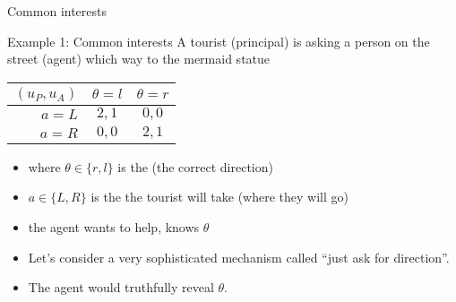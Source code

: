 \documentclass[english,10pt
,aspectratio=169
]{beamer}
\begin{document}
\begin{frame}{Common interests}
	\begin{exampleblock}{Example 1: Common interests}
		A tourist (principal) is asking a person on the street (agent) which way to the mermaid statue
		\begin{center}
			\begin{tabular}{r | c | c |}
				$(u_P,u_A)$	& $\theta=l$	& $\theta=r$
				\\ \hline 
				$a=L$ 		& $2,1$			& $0,0$
				\\ \hline
				$a=R$		& $0,0$			& $2,1$
				\\ \hline 
			\end{tabular}
		\end{center}
	\end{exampleblock}
	 
	\begin{itemize}
		\item where $\theta\in \{r,l\}$ is the  (the correct direction)
		\item $a \in \{L,R\}$ is the  the tourist will take (where they will go)
		\item the agent wants to help, knows $\theta$
		\pause \bigskip 
		\item Let's consider a very sophisticated \alert<2>{mechanism} called ``just ask for direction''.
		\pause
		\item The agent would truthfully reveal $\theta$.
	\end{itemize}
\end{frame}
\end{document}
